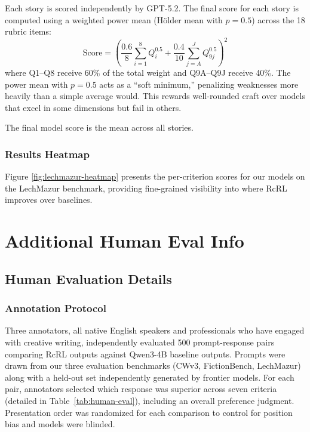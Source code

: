 \documentclass{article}
\theoremstyle{plain}
\theoremstyle{definition}
\theoremstyle{remark}
\begin{document}
Each story is scored independently by GPT-5.2. The final score for each story is computed using a weighted power mean (Hölder mean with $p = 0.5$) across the 18 rubric items:
\begin{equation}
    \text{Score} = \left( \frac{0.6}{8} \sum_{i=1}^{8} Q_i^{0.5} + \frac{0.4}{10} \sum_{j=A}^{J} Q_{9j}^{0.5} \right)^{2}
\end{equation}
where Q1--Q8 receive 60\% of the total weight and Q9A--Q9J receive 40\%. The power mean with $p = 0.5$ acts as a ``soft minimum,'' penalizing weaknesses more heavily than a simple average would. This rewards well-rounded craft over models that excel in some dimensions but fail in others.

The final model score is the mean across all stories.

\subsubsection{Results Heatmap}

Figure \ref{fig:lechmazur-heatmap} presents the per-criterion scores for our models on the LechMazur benchmark, providing fine-grained visibility into where RcRL improves over baselines.





















\section{Additional Human Eval Info}
\subsection{Human Evaluation Details}
\label{app:human-eval}

\subsubsection{Annotation Protocol}

Three annotators, all native English speakers and professionals who have engaged with creative writing, independently evaluated 500 prompt-response pairs comparing RcRL outputs against Qwen3-4B baseline outputs. Prompts were drawn from our three evaluation benchmarks (CWv3, FictionBench, LechMazur) along with a held-out set independently generated by frontier models. For each pair, annotators selected which response was superior across seven criteria (detailed in Table~\ref{tab:human-eval}), including an overall preference judgment. Presentation order was randomized for each comparison to control for position bias and models were blinded.
\end{document}
